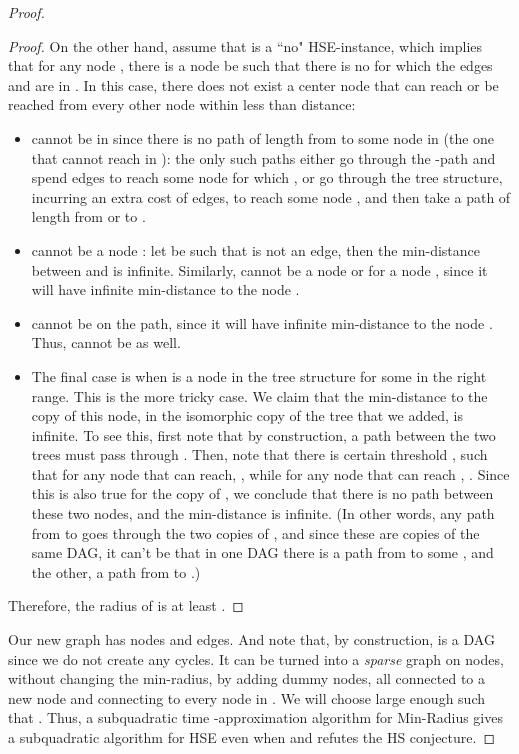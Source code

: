 \begin{proof}
\begin{proof}
On the other hand, assume that  is a ``no" HSE-instance, which implies that for any node , there is a node  be such that there is no  for which the edges  and  are in . 
In this case, there does not exist a center node  that can reach or be reached from every other node  within less than  distance:
\begin{itemize}
\item  cannot be in  since there is no path of length  from  to some node  in  (the one that  cannot reach in ): the only such paths either go through the -path and spend  edges to reach some node  for which , or go through the tree structure, incurring an extra cost of  edges, to reach some node , and then take a path of length  from  or  to .
\item  cannot be a node : let  be such that  is not an edge, then the min-distance between  and  is infinite. Similarly,  cannot be a node  or  for a node , since it will have infinite min-distance to the node .
\item  cannot be on the  path, since it will have infinite min-distance to the node . Thus,  cannot be  as well.
\item  The final case is when  is a node in the tree structure  for some  in the right range.
This is the more tricky case.
We claim that the min-distance to the copy of this node, in the isomorphic copy of the tree that we added, is infinite. 
To see this, first note that by construction, a path between the two trees must pass through .
Then, note that there is certain threshold , such that for any node  that  can reach, , while for any node  that can reach , . 
Since this is also true for the copy of , we conclude that there is no path between these two nodes, and the min-distance is infinite. (In other words, any path from  to  goes through the two copies of , and since these are copies of the same DAG, it can't be that in one DAG there is a path from  to some , and the other, a path from  to .)
\end{itemize}

Therefore, the radius of  is at least .
\end{proof}

Our new graph  has  nodes and  edges.
And note that, by construction,  is a DAG since we do not create any cycles.
It can be turned into a \emph{sparse} graph on  nodes, without changing the min-radius, by adding dummy nodes, all connected to a new node  and connecting  to every node in .
We will choose  large enough such that .
Thus, a subquadratic  time -approximation algorithm for Min-Radius gives a subquadratic algorithm for HSE even when  and refutes the HS conjecture.
\end{proof}


